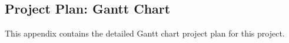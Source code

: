 \documentclass[a4paper,11pt]{report}
\begin{document}





\begin{appendix}
    
\chapter{Project Plan: Gantt Chart} %
\label{cha:project_plan_gantt_chart}
This appendix contains the detailed Gantt chart project plan for this project.




\end{appendix}
\end{document}
